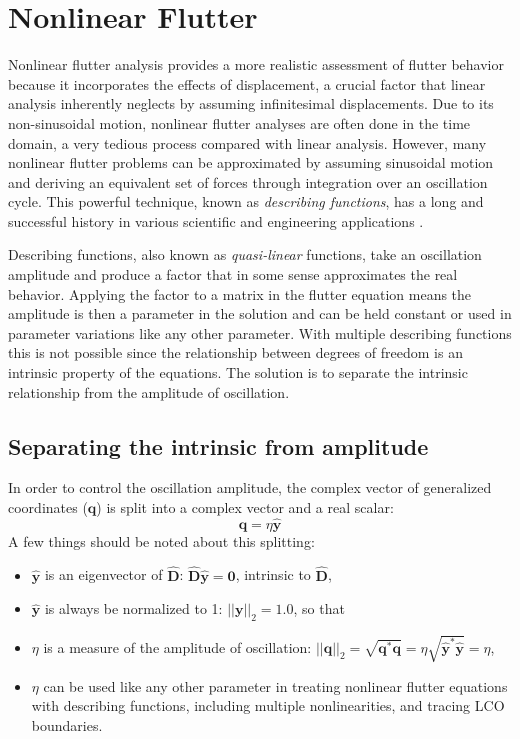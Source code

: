 \documentclass[10pt,openany,twoside]{book}
\numberwithin{equation}{section}   %
\newcommand{\Newterm}[1]{{\em #1}}
\newcommand{\Matrix}[1]{\boldsymbol{#1}}
\newcommand{\Vector}[1]{\boldsymbol{#1}}
\begin{document}
\chapter{Nonlinear Flutter}\label{chap:nonlinear}
Nonlinear flutter analysis
provides a more realistic assessment of flutter behavior because it incorporates
the effects of displacement, a crucial factor that linear analysis
inherently neglects by assuming infinitesimal displacements.
Due to its non-sinusoidal motion, nonlinear flutter analyses are often
done in the time domain, a very tedious process compared with linear analysis.
However, many nonlinear flutter problems can be approximated by assuming
sinusoidal motion and deriving an equivalent set of forces through
integration over an oscillation cycle. This powerful technique, known
as \Newterm{describing functions},
has a long and successful history in various
scientific and engineering applications \cite{gelb1968multiple}.

Describing functions, also known as \Newterm{quasi-linear} functions,
take an oscillation amplitude and produce a factor that in some sense
approximates the real behavior. Applying the factor to a matrix in
the flutter equation means the amplitude is then a parameter in the
solution and can be held constant or used in parameter variations like any
other parameter. With multiple describing functions this is not possible
since the relationship between degrees of freedom is an intrinsic
property of the equations. The solution is to separate the intrinsic
relationship from the amplitude of oscillation.

\section{Separating the intrinsic from amplitude}\label{sect:separation}
In order to control the oscillation amplitude, the complex vector of
generalized coordinates ($\Vector{q}$) is split into a complex vector
and a real scalar:
\begin{equation}\label{eqn:eta-def}
	\Vector{q} = \eta \Vector{\hat{y}}
\end{equation}
A few things should be noted about this splitting:
\begin{itemize}
	\item $\Vector{\hat{y}}$ is an eigenvector of $\hat{\Matrix{D}}$:
		$\hat{\Matrix{D}}\hat{\Vector{y}} = \Vector{0}$,
			intrinsic to $\hat{\Matrix{D}}$,
	\item $\Vector{\hat{y}}$ is always be normalized to 1:
		$||\Vector{y}||_2 = 1.0$, so that
	\item $\eta$ is a measure of the amplitude of oscillation:
		$||\Vector{q}||_2 = \sqrt{\Vector{q}^*\Vector{q}} =
			\eta\sqrt{\Vector{\hat{y}}^*\Vector{\hat{y}}} = \eta$,
	\item $\eta$ can be used like any other parameter in treating nonlinear
		flutter equations with describing functions, including multiple
		nonlinearities, and tracing LCO boundaries.
\end{itemize}
\end{document}

